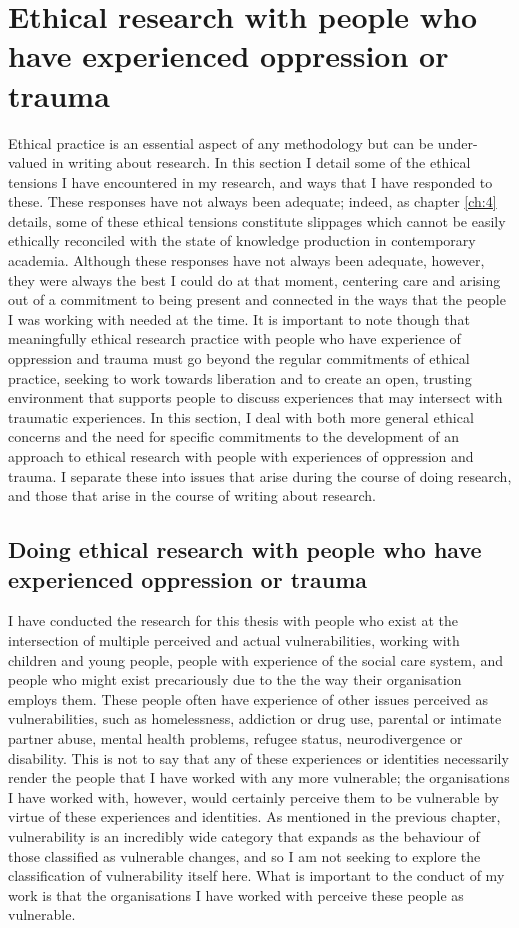 \section{Ethical research with people who have experienced oppression or trauma}
\label{sec:3-4-ethics}
Ethical practice is an essential aspect of any methodology but can be under-valued in writing about research. In this section I detail some of the ethical tensions I have encountered in my research, and ways that I have responded to these. These responses have not always been adequate; indeed, as chapter \ref{ch:4} details, some of these ethical tensions constitute slippages \citep{cutting_making_2021} which cannot be easily ethically reconciled with the state of knowledge production in contemporary academia. Although these responses have not always been adequate, however, they were always the best I could do at that moment, centering care and arising out of a commitment to being present and connected in the ways that the people I was working with needed at the time. It is important to note though that meaningfully ethical research practice with people who have experience of oppression and trauma must go beyond the regular commitments of ethical practice, seeking to work towards liberation and to create an open, trusting environment that supports people to discuss experiences that may intersect with traumatic experiences. In this section, I deal with both more general ethical concerns and the need for specific commitments to the development of an approach to ethical research with people with experiences of oppression and trauma. I separate these into issues that arise during the course of doing research, and those that arise in the course of writing about research. 

\subsection{Doing ethical research with people who have experienced oppression or trauma}
I have conducted the research for this thesis with people who exist at the intersection of multiple perceived and actual vulnerabilities, working with children and young people, people with experience of the social care system, and people who might exist precariously due to the the way their organisation employs them. These people often have experience of other issues perceived as vulnerabilities, such as homelessness,  addiction or drug use, parental or intimate partner abuse, mental health problems, refugee status, neurodivergence or disability. This is not to say that any of these experiences or identities necessarily render the people that I have worked with any more vulnerable; the organisations I have worked with, however, would certainly perceive them to be vulnerable by virtue of these experiences and identities. As mentioned in the previous chapter, vulnerability is an incredibly wide category that expands as the behaviour of those classified as vulnerable changes, and so I am not seeking to explore the classification of vulnerability itself here. What is important to the conduct of my work is that the organisations I have worked with perceive these people as vulnerable. 

